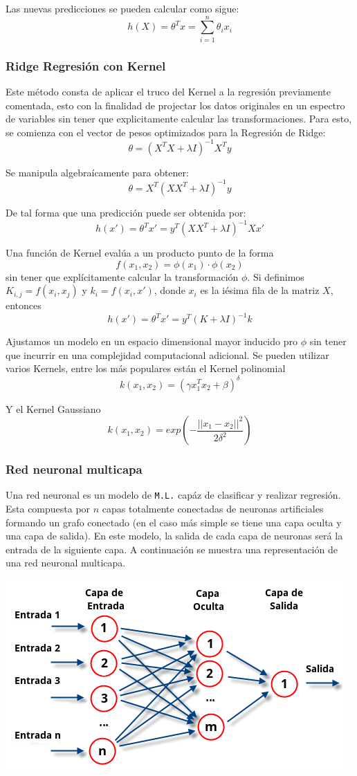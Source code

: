 {Las nuevas predicciones se pueden calcular como sigue: $$h(X) = \theta^Tx=\sum_{i=1}^{n} \theta_ix_i$$

\subsubsection*{Ridge Regresión con Kernel}

Este método consta de aplicar el truco del Kernel a la regresión previamente comentada, esto con la finalidad de projectar los datos originales en un espectro de variables sin tener que explicitamente calcular las transformaciones. Para esto, se comienza con el vector de pesos optimizados para la Regresión de Ridge: $$\theta = (X^TX+\lambda I)^{-1} X^T y$$

Se manipula algebraícamente para obtener: $$\theta = X^T(XX^T + \lambda I)^{-1}y$$

De tal forma que una predicción puede ser obtenida por: $$h(x') = \theta^Tx' = y^T(XX^T + \lambda I)^{-1}Xx'$$

Una función de Kernel evalúa a un producto punto de la forma $$f(x_1,x_2) = \phi (x_1)\cdot \phi (x_2)$$ sin tener que explícitamente calcular la transformación $\phi$. Si definimos $K_{i,j}=f(x_i,x_j)$ y $k_i = f(x_i,x')$, donde $x_i$ es la iésima fila de la matriz $X$, entonces $$h(x') = \theta^Tx' = y^T(K + \lambda I)^{-1}k$$

Ajustamos un modelo en un espacio dimensional mayor inducido pro $\phi$ sin tener que incurrir en una complejidad computacional adicional. Se pueden utilizar varios Kernels, entre los más populares están el Kernel polinomial $$k(x_1,x_2)=( \gamma x_{1}^{T} x_2 + \beta)^ {\delta}$$

Y el Kernel Gaussiano $$k(x_1,x_2)=exp(-\frac{||x_1-x_2||^2}{2{\delta}^2})$$

\subsubsection*{Red neuronal multicapa}

Una red neuronal es un modelo de \texttt{M.L.} capáz de clasificar y realizar regresión. Esta compuesta por $n$ capas totalmente conectadas de neuronas artificiales formando un grafo conectado (en el caso más simple se tiene una capa oculta y una capa de salida). En este modelo, la salida de cada capa de neuronas será la entrada de la siguiente capa. A continuación se muestra una representación de una red neuronal multicapa.

\includegraphics[width=\maxwidth]{figures/NeuralNetwork.png} 

}
